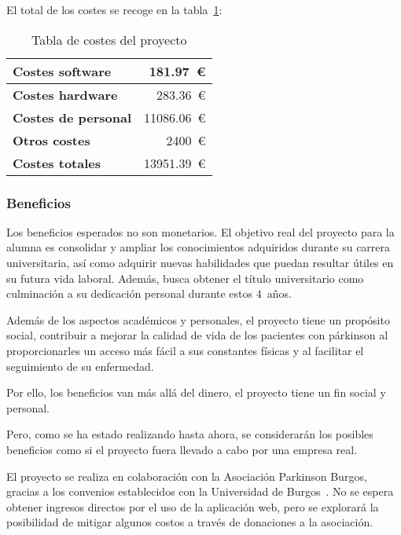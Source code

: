 El total de los costes se recoge en la tabla~\ref{tabla:costesTotales}:
\begin{table}[h]
  \centering
  \begin{tabular}{|l|r|}
    \hline
    \textbf{Costes software} & 181.97~€ \\
    \hline
    \textbf{Costes hardware} & 283.36~€ \\
    \hline
    \textbf{Costes de personal} & 11086.06~€ \\
    \hline
    \textbf{Otros costes} & 2400~€ \\
    \hline
    \textbf{Costes totales} & 13951.39~€ \\
    \hline
  \end{tabular}
  \caption{Tabla de costes del proyecto}
  \label{tabla:costesTotales}
\end{table}






\subsubsection{Beneficios}
Los beneficios esperados no son monetarios. El objetivo real del proyecto para la alumna es consolidar y ampliar los conocimientos adquiridos durante su carrera universitaria, así como adquirir nuevas habilidades que puedan resultar útiles en su futura vida laboral. Además, busca obtener el título universitario como culminación a su dedicación personal durante estos 4~años.

Además de los aspectos académicos y personales, el proyecto tiene un propósito social, contribuir a mejorar la calidad de vida de los pacientes con párkinson al proporcionarles un acceso más fácil a sus constantes físicas y al facilitar el seguimiento de su enfermedad. 

Por ello, los beneficios van más allá del dinero, el proyecto tiene un fin social y personal.


Pero, como se ha estado realizando hasta ahora, se considerarán los posibles beneficios como si el proyecto fuera llevado a cabo por una empresa real. 

El proyecto se realiza en colaboración con la Asociación Parkinson Burgos, gracias a los convenios establecidos con la Universidad de Burgos~\cite{UBUxparkinson}. No se espera obtener ingresos directos por el uso de la aplicación web, pero se explorará la posibilidad de mitigar algunos costos a través de donaciones a la asociación.

